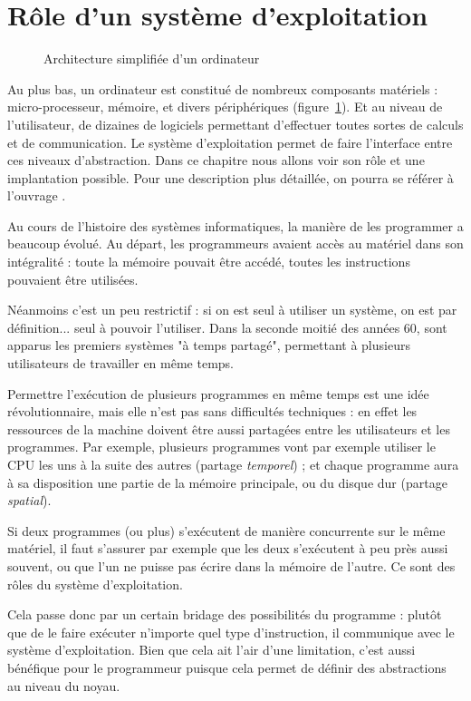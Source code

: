 \section{Rôle d'un système d'exploitation}

\begin{figure}
\centering

\caption{Architecture simplifiée d'un ordinateur}
\label{fig:archi-simplifiee}
\end{figure}

Au plus bas, un ordinateur est constitué de nombreux composants matériels :
micro-processeur, mémoire, et divers périphériques
(figure~\ref{fig:archi-simplifiee}). Et au niveau de l'utilisateur, de dizaines
de logiciels permettant d'effectuer toutes sortes de calculs et de
communication. Le système d'exploitation permet de faire l'interface entre ces
niveaux d'abstraction. Dans ce chapitre nous allons voir son rôle et une
implantation possible. Pour une description plus détaillée, on pourra se référer
à l'ouvrage \cite{tanenbaum}.

Au cours de l'histoire des systèmes informatiques, la manière de les programmer
a beaucoup évolué. Au départ, les programmeurs avaient accès au matériel dans
son intégralité : toute la mémoire pouvait être accédé, toutes les instructions
pouvaient être utilisées.

Néanmoins c'est un peu restrictif : si on est seul à utiliser un système, on est
par définition... seul à pouvoir l'utiliser. Dans la seconde moitié des années
60, sont apparus les premiers systèmes "à temps partagé", permettant à plusieurs
utilisateurs de travailler en même temps.

Permettre l'exécution de plusieurs programmes en même temps est une idée
révolutionnaire, mais elle n'est pas sans difficultés techniques : en effet les
ressources de la machine doivent être aussi partagées entre les utilisateurs et
les programmes. Par exemple, plusieurs programmes vont par exemple utiliser le
CPU les uns à la suite des autres (partage \emph{temporel}) ; et chaque
programme aura à sa disposition une partie de la mémoire principale, ou du
disque dur (partage \emph{spatial}).

Si deux programmes (ou plus) s'exécutent de manière concurrente sur le même
matériel, il faut s'assurer par exemple que les deux s'exécutent à peu près
aussi souvent, ou que l'un ne puisse pas écrire dans la mémoire de l'autre. Ce
sont des rôles du système d'exploitation.

Cela passe donc par un certain bridage des possibilités du programme : plutôt
que de le faire exécuter n'importe quel type d'instruction, il communique avec
le système d'exploitation. Bien que cela ait l'air d'une limitation, c'est aussi
bénéfique pour le programmeur puisque cela permet de définir des abstractions au
niveau du noyau.


